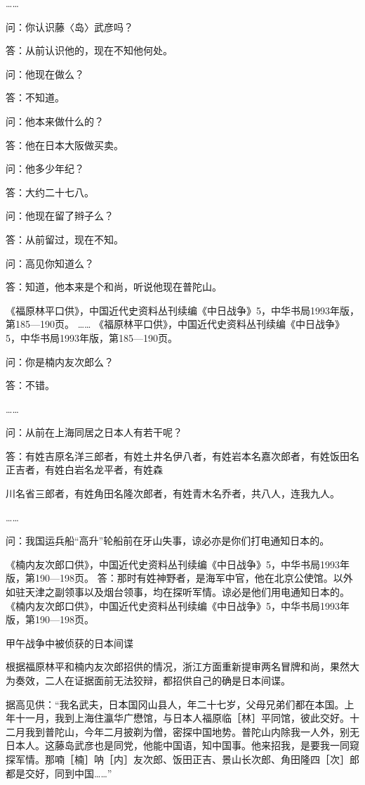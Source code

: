 \documentclass[12pt,UTF8]{ctexbook}
\begin{document}
……

问：你认识藤〈岛〉武彦吗？

答：从前认识他的，现在不知他何处。

问：他现在做么？

答：不知道。

问：他本来做什么的？

答：他在日本大阪做买卖。

问：他多少年纪？

答：大约二十七八。

问：他现在留了辫子么？

答：从前留过，现在不知。

问：高见你知道么？

答：知道，他本来是个和尚，听说他现在普陀山。

《福原林平口供》，中国近代史资料丛刊续编《中日战争》5，中华书局1993年版，第185—190页。
…… 《福原林平口供》，中国近代史资料丛刊续编《中日战争》5，中华书局1993年版，第185—190页。

问：你是楠内友次郎么？

答：不错。

……

问：从前在上海同居之日本人有若干呢？

答：有姓吉原名洋三郎者，有姓土井名伊八者，有姓岩本名嘉次郎者，有姓饭田名正吉者，有姓白岩名龙平者，有姓森

川名省三郎者，有姓角田名隆次郎者，有姓青木名乔者，共八人，连我九人。

……

问：我国运兵船“高升”轮船前在牙山失事，谅必亦是你们打电通知日本的。

《楠内友次郎口供》，中国近代史资料丛刊续编《中日战争》5，中华书局1993年版，第190—198页。
答：那时有姓神野者，是海军中官，他在北京公使馆。以外如驻天津之副领事以及烟台领事，均在探听军情。谅必是他们用电通知日本的。 《楠内友次郎口供》，中国近代史资料丛刊续编《中日战争》5，中华书局1993年版，第190—198页。


甲午战争中被侦获的日本间谍

根据福原林平和楠内友次郎招供的情况，浙江方面重新提审两名冒牌和尚，果然大为奏效，二人在证据面前无法狡辩，都招供自己的确是日本间谍。

据高见供：“我名武夫，日本国冈山县人，年二十七岁，父母兄弟们都在本国。上年十一月，我到上海住瀛华广懋馆，与日本人福原临［林］平同馆，彼此交好。十二月我到普陀山，今年二月披剃为僧，密探中国地势。普陀山内除我一人外，别无日本人。这藤岛武彦也是同党，他能中国语，知中国事。他来招我，是要我一同窥探军情。那喃［楠］呐［内］友次郎、饭田正吉、景山长次郎、角田隆四［次］郎都是交好，同到中国……”
\end{document}
